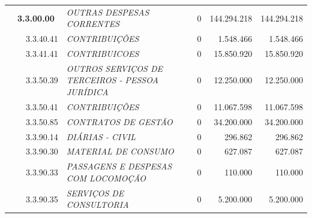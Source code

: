 \documentclass{article}
\begin{document}
\begin{longtable}[c]{m{0.1cm}m{0.1cm}m{0.8cm}|m{8cm}|m{2cm}|m{2cm}|m{2cm}}
\multicolumn{1}{l}{} & \multicolumn{2}{l|}{\textbf{3.3.00.00}} & \multicolumn{1}{L{8cm}|}{\textit{OUTRAS DESPESAS CORRENTES}} & \multicolumn{1}{r|}{0} & \multicolumn{1}{r|}{144.294.218} &  \multicolumn{1}{r}{144.294.218}\\
\multicolumn{1}{l}{} & \multicolumn{1}{l}{} & \multicolumn{1}{l|}{3.3.40.41} & \multicolumn{1}{L{8cm}|}{\textit{CONTRIBUIÇÕES}} & \multicolumn{1}{r|}{0} & \multicolumn{1}{r|}{1.548.466} &  \multicolumn{1}{r}{1.548.466}\\
\multicolumn{1}{l}{} & \multicolumn{1}{l}{} & \multicolumn{1}{l|}{3.3.41.41} & \multicolumn{1}{L{8cm}|}{\textit{CONTRIBUICOES}} & \multicolumn{1}{r|}{0} & \multicolumn{1}{r|}{15.850.920} &  \multicolumn{1}{r}{15.850.920}\\
\multicolumn{1}{l}{} & \multicolumn{1}{l}{} & \multicolumn{1}{l|}{3.3.50.39} & \multicolumn{1}{L{8cm}|}{\textit{OUTROS SERVIÇOS DE TERCEIROS - PESSOA JURÍDICA}} & \multicolumn{1}{r|}{0} & \multicolumn{1}{r|}{12.250.000} &  \multicolumn{1}{r}{12.250.000}\\
\multicolumn{1}{l}{} & \multicolumn{1}{l}{} & \multicolumn{1}{l|}{3.3.50.41} & \multicolumn{1}{L{8cm}|}{\textit{CONTRIBUIÇÕES}} & \multicolumn{1}{r|}{0} & \multicolumn{1}{r|}{11.067.598} &  \multicolumn{1}{r}{11.067.598}\\
\multicolumn{1}{l}{} & \multicolumn{1}{l}{} & \multicolumn{1}{l|}{3.3.50.85} & \multicolumn{1}{L{8cm}|}{\textit{CONTRATOS DE GESTÃO}} & \multicolumn{1}{r|}{0} & \multicolumn{1}{r|}{34.200.000} &  \multicolumn{1}{r}{34.200.000}\\
\multicolumn{1}{l}{} & \multicolumn{1}{l}{} & \multicolumn{1}{l|}{3.3.90.14} & \multicolumn{1}{L{8cm}|}{\textit{DIÁRIAS -  CIVIL}} & \multicolumn{1}{r|}{0} & \multicolumn{1}{r|}{296.862} &  \multicolumn{1}{r}{296.862}\\
\multicolumn{1}{l}{} & \multicolumn{1}{l}{} & \multicolumn{1}{l|}{3.3.90.30} & \multicolumn{1}{L{8cm}|}{\textit{MATERIAL DE CONSUMO}} & \multicolumn{1}{r|}{0} & \multicolumn{1}{r|}{627.087} &  \multicolumn{1}{r}{627.087}\\
\multicolumn{1}{l}{} & \multicolumn{1}{l}{} & \multicolumn{1}{l|}{3.3.90.33} & \multicolumn{1}{L{8cm}|}{\textit{PASSAGENS E DESPESAS COM LOCOMOÇÃO}} & \multicolumn{1}{r|}{0} & \multicolumn{1}{r|}{110.000} &  \multicolumn{1}{r}{110.000}\\
\multicolumn{1}{l}{} & \multicolumn{1}{l}{} & \multicolumn{1}{l|}{3.3.90.35} & \multicolumn{1}{L{8cm}|}{\textit{SERVIÇOS DE CONSULTORIA}} & \multicolumn{1}{r|}{0} & \multicolumn{1}{r|}{5.200.000} &  \multicolumn{1}{r}{5.200.000}\\

\end{longtable}
\end{document}
